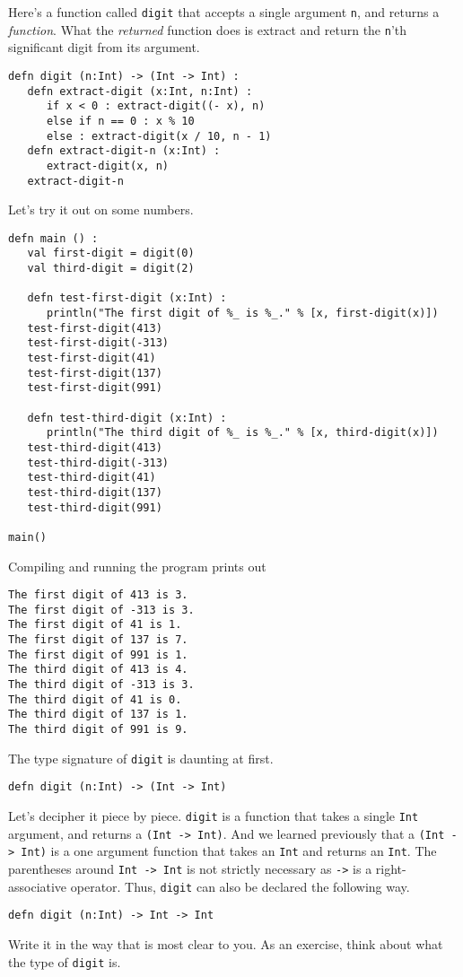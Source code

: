 \documentclass[10pt,oneside]{book}
\begin{document}
Here's a function called \texttt{\frenchspacing digit} that accepts a single argument \texttt{\frenchspacing n}, and returns a {\em function}. What the {\em returned} function does is extract and return the \texttt{\frenchspacing n}'th significant digit from its argument.
\begin{lstlisting}
defn digit (n:Int) -> (Int -> Int) :
   defn extract-digit (x:Int, n:Int) :
      if x < 0 : extract-digit((- x), n)
      else if n == 0 : x % 10
      else : extract-digit(x / 10, n - 1)
   defn extract-digit-n (x:Int) :
      extract-digit(x, n)
   extract-digit-n
\end{lstlisting}
Let's try it out on some numbers.
\begin{lstlisting}
defn main () :
   val first-digit = digit(0)
   val third-digit = digit(2)

   defn test-first-digit (x:Int) :
      println("The first digit of %_ is %_." % [x, first-digit(x)])
   test-first-digit(413)
   test-first-digit(-313)
   test-first-digit(41)
   test-first-digit(137)
   test-first-digit(991)

   defn test-third-digit (x:Int) :
      println("The third digit of %_ is %_." % [x, third-digit(x)])
   test-third-digit(413)
   test-third-digit(-313)
   test-third-digit(41)
   test-third-digit(137)
   test-third-digit(991)

main()   
\end{lstlisting}
Compiling and running the program prints out
\begin{lstlisting}
The first digit of 413 is 3.
The first digit of -313 is 3.
The first digit of 41 is 1.
The first digit of 137 is 7.
The first digit of 991 is 1.
The third digit of 413 is 4.
The third digit of -313 is 3.
The third digit of 41 is 0.
The third digit of 137 is 1.
The third digit of 991 is 9.
\end{lstlisting}

The type signature of \texttt{\frenchspacing digit} is daunting at first. 
\begin{lstlisting}
defn digit (n:Int) -> (Int -> Int)
\end{lstlisting}
Let's decipher it piece by piece. \texttt{\frenchspacing digit} is a function that takes a single \texttt{\frenchspacing Int} argument, and returns a \texttt{\frenchspacing (Int -> Int)}. And we learned previously that a \texttt{\frenchspacing (Int -> Int)} is a one argument function that takes an \texttt{\frenchspacing Int} and returns an \texttt{\frenchspacing Int}. The parentheses around \texttt{\frenchspacing Int -> Int} is not strictly necessary as \texttt{\frenchspacing ->} is a right-associative operator. Thus, \texttt{\frenchspacing digit} can also be declared the following way.
\begin{lstlisting}
defn digit (n:Int) -> Int -> Int
\end{lstlisting}
Write it in the way that is most clear to you. As an exercise, think about what the type of \texttt{\frenchspacing digit} is. 
\end{document}
